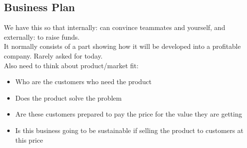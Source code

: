 \documentclass{article}
\begin{document}
\subsection{Business Plan}
We have this so that internally: can convince teammates and yourself, and externally: to raise funds. \\ It normally consists of a part showing how it will be developed into a profitable company. Rarely asked for today. \\
Also need to think about product/market fit:
\begin{itemize}
    \item Who are the customers who need the product
    \item Does the product solve the problem
    \item Are these customers prepared to pay the price for the value they are getting
    \item Is this business going to be sustainable if selling the product to customers at this price
\end{itemize}
\end{document}
